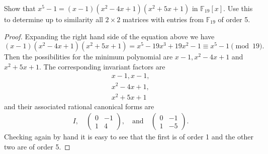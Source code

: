 \documentclass[10pt]{amsart}
\begin{document}
\begin{thm}
  \label{Ex7}
  Show that $x^5 - 1 = (x-1)(x^2 - 4x + 1)(x^2 + 5x + 1)$ in $\mathbb{F}_{19}[x]$.
  Use this to determine up to similarity all $2 \times 2$ matrices with entries from $\mathbb{F}_{19}$ of order 5.
  \begin{proof}
    Expanding the right hand side of the equation above we have $$(x-1)(x^2 - 4x + 1)(x^2 + 5x + 1) = x^5 -19x^3 + 19x^2 - 1 \equiv x^5 - 1 \pmod{19}.$$
    Then the possibilities for the minimum polynomial are $x-1, x^2 - 4x +1 $ and $x^2 + 5x + 1$.
    The corresponding invariant factors are 
    \begin{align*}
      x-1, x-1,\\
      x^2 - 4x + 1,\\
      x^2 + 5x + 1
    \end{align*}
    and their associated rational canonical forms are 
    \begin{align*}
      I, \quad
      \begin{pmatrix}
        0 & -1\\
        1 & 4
      \end{pmatrix},
      \quad \text{and} \quad
      \begin{pmatrix}
        0 & -1\\
        1 & -5
      \end{pmatrix}.
    \end{align*}
    Checking again by hand it is easy to see that the first is of order 1 and the other two are of order 5.
  \end{proof}
\end{thm}
\end{document}
